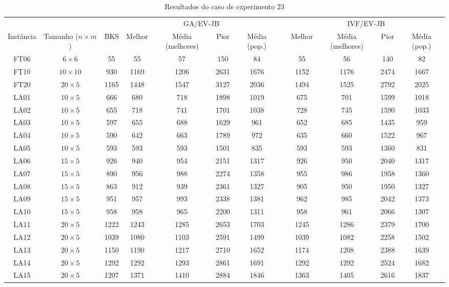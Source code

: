 \begin{sidewaystable}
\caption{Resultados do caso de experimento 23}
\centering
\label{experimento23}
\begin{tabular}{cccccccccccc}
\toprule
& & & \multicolumn{4}{c}{GA/EV-JB} & & \multicolumn{4}{c}{IVF/EV-JB} \\
\cmidrule(c){4-7}
\cmidrule(c){9-12}
Inst\^{a}ncia & Tamanho ($n \times m$) & BKS & Melhor & M\'{e}dia (melhores) & Pior & M\'{e}dia (pop.) & & Melhor & M\'{e}dia (melhores) & Pior & M\'{e}dia (pop.) \\
\midrule
FT06 & $6 \times 6$ & 55 & 55 & 57 & 150 & 84 & & 55 & 56 & 140 & 82 \\
FT10 & $10 \times 10$ & 930 & 1169 & 1206 & 2631 & 1676 & & 1152 & 1176 & 2474 & 1667 \\
FT20 & $20 \times 5$ & 1165 & 1448 & 1547 & 3127 & 2036 & & 1494 & 1525 & 2792 & 2025 \\
LA01 & $10 \times 5$ & 666 & 680 & 718 & 1898 & 1019 & & 675 & 701 & 1599 & 1018 \\
LA02 & $10 \times 5$ & 655 & 718 & 741 & 1701 & 1038 & & 728 & 745 & 1590 & 1033 \\
LA03 & $10 \times 5$ & 597 & 655 & 688 & 1629 & 961 & & 652 & 685 & 1435 & 959 \\
LA04 & $10 \times 5$ & 590 & 642 & 663 & 1789 & 972 & & 635 & 660 & 1522 & 967 \\
LA05 & $10 \times 5$ & 593 & 593 & 593 & 1501 & 835 & & 593 & 593 & 1360 & 831 \\
LA06 & $15 \times 5$ & 926 & 940 & 954 & 2151 & 1317 & & 926 & 950 & 2040 & 1317 \\
LA07 & $15 \times 5$ & 890 & 956 & 988 & 2274 & 1358 & & 955 & 986 & 1958 & 1360 \\
LA08 & $15 \times 5$ & 863 & 912 & 939 & 2361 & 1327 & & 905 & 950 & 1950 & 1327 \\
LA09 & $15 \times 5$ & 951 & 957 & 993 & 2338 & 1381 & & 962 & 985 & 2042 & 1373 \\
LA10 & $15 \times 5$ & 958 & 958 & 965 & 2200 & 1311 & & 958 & 961 & 2066 & 1307 \\
LA11 & $20 \times 5$ & 1222 & 1243 & 1285 & 2653 & 1703 & & 1245 & 1286 & 2379 & 1700 \\
LA12 & $20 \times 5$ & 1039 & 1080 & 1103 & 2591 & 1499 & & 1039 & 1082 & 2258 & 1502 \\
LA13 & $20 \times 5$ & 1150 & 1190 & 1217 & 2710 & 1652 & & 1174 & 1208 & 2388 & 1639 \\
LA14 & $20 \times 5$ & 1292 & 1292 & 1293 & 2861 & 1691 & & 1292 & 1292 & 2524 & 1682 \\
LA15 & $20 \times 5$ & 1207 & 1371 & 1410 & 2884 & 1846 & & 1363 & 1405 & 2616 & 1837 \\
\bottomrule
\end{tabular}
\end{sidewaystable}
